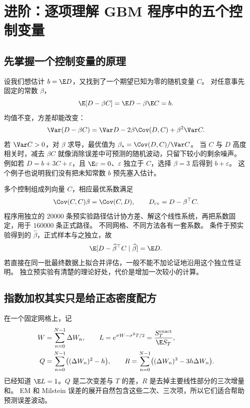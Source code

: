 \section{进阶：逐项理解 GBM 程序中的五个控制变量}\label{sec:controls}
\subsection{先掌握一个控制变量的原理}
设我们想估计 $b=\E D$，又找到了一个期望已知为零的随机变量 $C$。
对任意事先固定的常数 $\beta$，
\begin{equation}\label{eq:cv-unbiased}
 \E[D-\beta C]=\E D-\beta\E C=b.
\end{equation}
均值不变，方差却能改变：
\begin{equation}\label{eq:cv-variance}
 \Var(D-\beta C)=\Var D-2\beta\Cov(D,C)+\beta^2\Var C.
\end{equation}
若 $\Var C>0$，对 $\beta$ 求导，最优值为 $\beta_\star=\Cov(D,C)/\Var C$。
当 $C$ 与 $D$ 高度相关时，减去 $\beta C$ 就像消除误差中可预测的随机波动，只留下较小的剩余噪声。
例如若 $D=b+3C+\varepsilon$，且 $\E\varepsilon=0$、$\varepsilon$ 独立于 $C$，选择 $\beta=3$ 后得到 $b+\varepsilon$。
这个例子也说明我们没有把未知常数 $b$ 预先塞入估计。

多个控制组成列向量 $C$，相应最优系数满足
\begin{equation}\label{eq:cv-vector}
 \Cov(C,C)\beta=\Cov(C,D),\qquad D_{\mathrm{cv}}=D-\beta^\top C.
\end{equation}
程序用独立的 $20000$ 条预实验路径估计协方差、解这个线性系统，再把系数固定，用于 $160000$ 条正式路径。
不同网格、不同方法各有一套系数。
条件于预实验得到的 $\widehat\beta$，正式样本与之独立，故
\begin{equation}\label{eq:cv-pilot}
 \E[D-\widehat\beta^\top C\mid\widehat\beta]=\E D.
\end{equation}
若直接在同一批最终数据上拟合并评估，一般不能不加论证地沿用这个独立性证明。
独立预实验有清楚的理论好处，代价是增加一次较小的计算。

\subsection{指数加权其实只是给正态密度配方}
在一个固定网格上，记
\begin{equation}\label{eq:cv-defs}
\begin{aligned}
 W&=\sum_{n=0}^{N-1}\Delta W_n,\qquad
 L=e^{\sigma W-\sigma^2T/2}=\frac{S_T^{\mathrm{exact}}}{\E S_T},\\
 Q&=\sum_{n=0}^{N-1}\bigl((\Delta W_n)^2-h\bigr),\qquad
 R=\sum_{n=0}^{N-1}\bigl((\Delta W_n)^3-3h\Delta W_n\bigr).
\end{aligned}
\end{equation}
已经知道 $\E L=1$。$Q$ 是二次变差与 $T$ 的差，$R$ 是去掉主要线性部分的三次增量和。
EM 和 Milstein 误差的展开自然包含这些二次、三次项，所以它们适合帮助预测误差波动。


